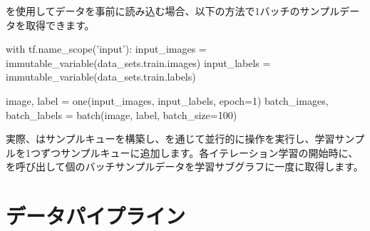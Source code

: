 \begin{content}
を使用してデータを事前に読み込む場合、以下の方法で1バッチのサンプルデータを取得できます。


\begin{leftbar}
\begin{python}
with tf.name_scope('input'):
  input_images = immutable_variable(data_sets.train.images)
  input_labels = immutable_variable(data_sets.train.labels)

  image, label = one(input_images, input_labels, epoch=1)
  batch_images, batch_labels = batch(image, label, batch_size=100)
\end{python}
\end{leftbar}

実際、はサンプルキューを構築し、を通じて並行的に操作を実行し、学習サンプルを1つずつサンプルキューに追加します。各イテレーション学習の開始時に、を呼び出して個のバッチサンプルデータを学習サブグラフに一度に取得します。

\end{content}

\section{データパイプライン}


